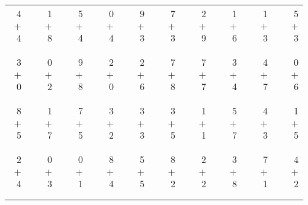 \documentclass[12pt, letterpaper]{article}
\begin{document}
\begin{tabular}{rrrrrrrrrrrrrrrrrrr}
4 & & 1 & & 5 & & 0 & & 9 & & 7 & & 2 & & 1 & & 1 & & 5\\
$+$ 4 & & $+$ 8 & & $+$ 4 & & $+$ 4 & & $+$ 3 & & $+$ 3 & & $+$ 9 & & $+$ 6 & & $+$ 3 & & $+$ 3\\
\cline{1-1} \cline{3-3} \cline{5-5} \cline{7-7} \cline{9-9} \cline{11-11} \cline{13-13} \cline{15-15} \cline{17-17} \cline{19-19} \\ \\
3 & & 0 & & 9 & & 2 & & 2 & & 7 & & 7 & & 3 & & 4 & & 0\\
$+$ 0 & & $+$ 2 & & $+$ 8 & & $+$ 0 & & $+$ 6 & & $+$ 8 & & $+$ 7 & & $+$ 4 & & $+$ 7 & & $+$ 6\\
\cline{1-1} \cline{3-3} \cline{5-5} \cline{7-7} \cline{9-9} \cline{11-11} \cline{13-13} \cline{15-15} \cline{17-17} \cline{19-19} \\ \\
8 & & 1 & & 7 & & 3 & & 3 & & 3 & & 1 & & 5 & & 4 & & 1\\
$+$ 5 & & $+$ 7 & & $+$ 5 & & $+$ 2 & & $+$ 3 & & $+$ 5 & & $+$ 1 & & $+$ 7 & & $+$ 3 & & $+$ 5\\
\cline{1-1} \cline{3-3} \cline{5-5} \cline{7-7} \cline{9-9} \cline{11-11} \cline{13-13} \cline{15-15} \cline{17-17} \cline{19-19} \\ \\
2 & & 0 & & 0 & & 8 & & 5 & & 8 & & 2 & & 3 & & 7 & & 4\\
$+$ 4 & & $+$ 3 & & $+$ 1 & & $+$ 4 & & $+$ 5 & & $+$ 2 & & $+$ 2 & & $+$ 8 & & $+$ 1 & & $+$ 2\\
\cline{1-1} \cline{3-3} \cline{5-5} \cline{7-7} \cline{9-9} \cline{11-11} \cline{13-13} \cline{15-15} \cline{17-17} \cline{19-19} \\ \\
\end{tabular}
\newpage
\end{document}
